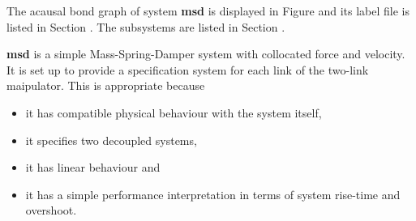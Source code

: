 

   The acausal bond graph of system \textbf{msd} is
   displayed in Figure  and its label
   file is listed in Section .
   The subsystems are listed in Section .


 \textbf{msd} is a simple Mass-Spring-Damper system with collocated
 force and velocity. It is set up to provide a specification system
 for each link of the two-link maipulator. This is appropriate because
 \begin{itemize}
 \item  it has compatible physical behaviour with the system itself,
 \item it specifies two decoupled systems,
 \item it has linear behaviour and
 \item it has a simple performance interpretation in terms of system
   rise-time and overshoot.
 \end{itemize}

